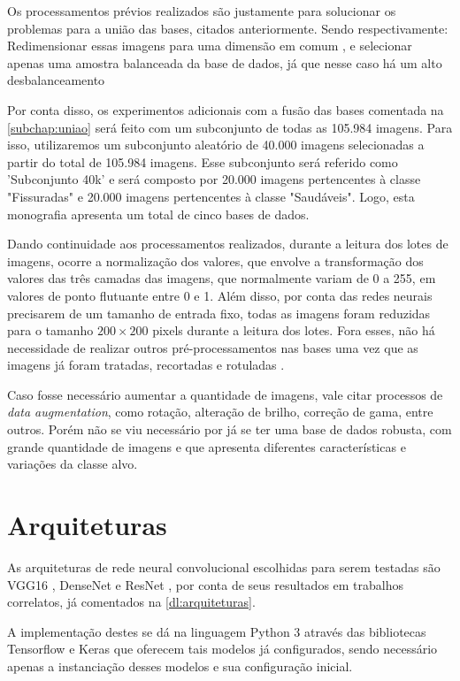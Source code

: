 Os processamentos prévios realizados são justamente para solucionar os problemas para a união das bases, citados anteriormente.
Sendo respectivamente: Redimensionar essas imagens para uma dimensão em comum \cite{thakur2022}, e selecionar apenas uma amostra balanceada da base de dados, já que nesse caso há um alto desbalanceamento

Por conta disso, os experimentos adicionais com a fusão das bases comentada na \autoref{subchap:uniao} será feito com um subconjunto de todas as 105.984 imagens.
Para isso, utilizaremos um subconjunto aleatório de 40.000 imagens selecionadas a partir do total de 105.984 imagens. 
Esse subconjunto será referido como 'Subconjunto 40k' e será composto por 20.000 imagens pertencentes à classe "Fissuradas" e 20.000 imagens pertencentes à classe "Saudáveis".
Logo, esta monografia apresenta um total de cinco bases de dados.

Dando continuidade aos processamentos realizados, durante a leitura dos lotes de imagens, ocorre a normalização dos valores, que envolve a transformação dos valores das três camadas das imagens, que normalmente variam de 0 a 255, em valores de ponto flutuante entre 0 e 1.
Além disso, por conta das redes neurais precisarem de um tamanho de entrada fixo, todas as imagens foram reduzidas para o tamanho $200 \times 200$ pixels durante a leitura dos lotes.
Fora esses, não há necessidade de realizar outros pré-processamentos nas bases uma vez que as imagens já foram tratadas, recortadas e rotuladas \cite{great_preprocess2022}.

Caso fosse necessário aumentar a quantidade de imagens, vale citar processos de \textit{data augmentation}, como rotação, alteração de brilho, correção de gama, entre outros. 
Porém não se viu necessário por já se ter uma base de dados robusta, com grande quantidade de imagens e que apresenta diferentes características e variações da classe alvo.

\section{Arquiteturas}
As arquiteturas de rede neural convolucional escolhidas para serem testadas são VGG16 \cite{simonyan2014very}, 
DenseNet \cite{huang2017densely} 
e ResNet \cite{he2016deep}, por conta de seus resultados em trabalhos correlatos, já comentados na \autoref{dl:arquiteturas}. 

A implementação destes se dá na linguagem Python 3 \cite{py3} através das bibliotecas Tensorflow \cite{tensorflow2015-whitepaper} e Keras \cite{chollet2015keras} que oferecem tais modelos já configurados, sendo necessário apenas a instanciação desses modelos e sua configuração inicial.

